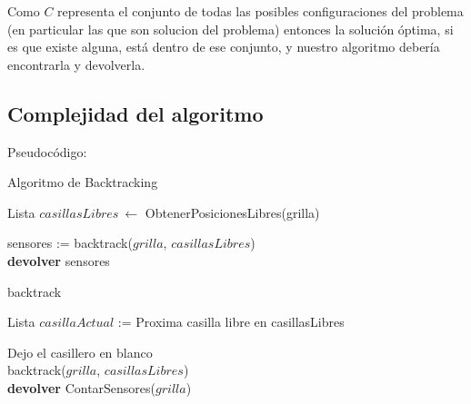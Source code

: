 Como $C$ representa el conjunto de todas las posibles configuraciones del problema (en particular las que son solucion del problema) entonces la solución óptima, si es que existe alguna, está dentro de ese conjunto, y nuestro algoritmo debería encontrarla y devolverla.

\subsection{Complejidad del algoritmo}

Pseudocódigo:

\begin{algorithm}[H]
	\SetAlgoLined
	\caption{Algoritmo de Backtracking}
	
	Lista $casillasLibres\ \leftarrow$ ObtenerPosicionesLibres(grilla)\\


	sensores := backtrack($grilla$, $casillasLibres$)\\

	\textbf{devolver} sensores
\end{algorithm}

\begin{algorithm}[H]
	\SetAlgoLined
	\caption{backtrack}
	\KwOut{}
	
	Lista $casillaActual$ := Proxima casilla libre en casillasLibres\\


	Dejo el casillero en blanco\\
	backtrack($grilla$, $casillasLibres$)\\

	\textbf{devolver} ContarSensores($grilla$)
\end{algorithm}

